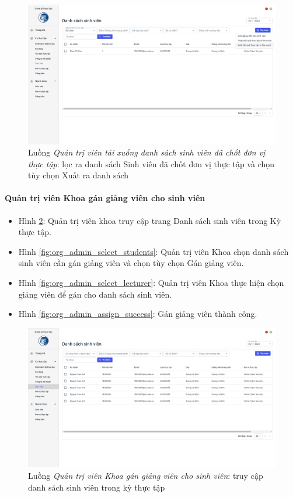 \documentclass[./../main.tex]{subfiles}
\begin{document}
\begin{figure}[]
	\includegraphics[width=\linewidth]{./images/image74.png}
	\caption{Luồng \emph{Quản trị viên tải xuống danh sách sinh viên đã chốt đơn vị thực tập}: lọc ra danh sách Sinh viên đã chốt đơn vị thực tập và chọn tùy chọn Xuất ra danh sách}
	\label{fig:org_admin_filter_students}
\end{figure}

\paragraph*{Quản trị viên Khoa gán giảng viên cho sinh viên}

\begin{itemize}
	\item Hình \ref{fig:org_admin_access_list_intern_students_1}: Quản trị viên khoa truy cập trang Danh sách sinh viên trong Kỳ thực tập. 
	\item Hình \ref{fig:org_admin_select_students}: Quản trị viên Khoa chọn danh sách sinh viên cần gán giảng viên và chọn tùy chọn Gán giảng viên.
	\item Hình \ref{fig:org_admin_select_lecturer}: Quản trị viên Khoa thực hiện chọn giảng viên để gán cho danh sách sinh viên.
	\item Hình \ref{fig:org_admin_assign_success}: Gán giảng viên thành công.
\end{itemize}

\begin{figure}[]
	\includegraphics[width=\linewidth]{./images/image75.png}
	\caption{Luồng \emph{Quản trị viên Khoa gán giảng viên cho sinh viên}: truy cập danh sách sinh viên trong kỳ thực tập}
	\label{fig:org_admin_access_list_intern_students_1}
\end{figure}
\end{document}

